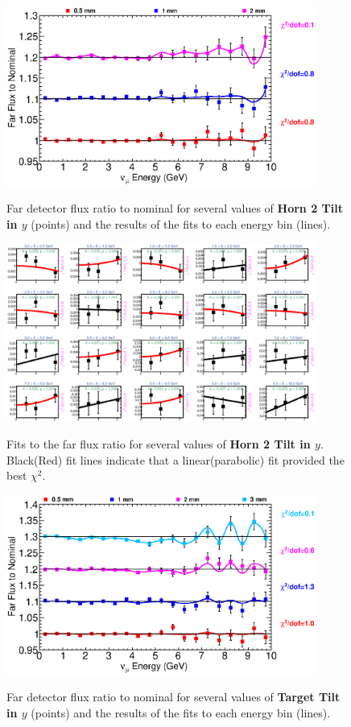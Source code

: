 \begin{figure}[ht]
  \begin{center}
    {\includegraphics[width=4.0in]{figures/Horn2YTilt_far_summary.eps}}
  \end{center}
\caption{ Far detector flux ratio to nominal for several values of {\bf Horn 2 Tilt in $y$} (points) and the results of the fits to each energy bin (lines).}
\end{figure}

\begin{figure}[hb]
  \begin{center}
    {\includegraphics[width=4.0in]{figures/Horn2YTilt_far_fits.eps}}
  \end{center}
\caption{ Fits to the far flux ratio for several values of {\bf Horn 2 Tilt in $y$}. Black(Red) fit lines indicate that a linear(parabolic) fit provided the best $\chi^2$. }
\end{figure}

\clearpage

\begin{figure}[ht]
  \begin{center}
    {\includegraphics[width=4.0in]{figures/TargetYTilt_far_summary.eps}}
  \end{center}
\caption{ Far detector flux ratio to nominal for several values of {\bf Target Tilt in $y$} (points) and the results of the fits to each energy bin (lines).}
\end{figure}

